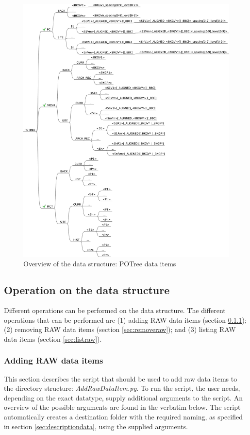 \begin{figure}[!ht]
 \centering
 \includegraphics[width=1\textwidth]{fig/directory_structure_potree}
 \caption{Overview of the data structure: POTree data items}
 \label{fig:directory_structure_overview_potree}
\end{figure}


\subsection{Operation on the data structure}
Different operations can be performed on the data structure. The different operations that can be performed are (1) adding RAW data items (section \ref{sec:addraw}); (2) removing RAW data items (section \ref{sec:removeraw}); and (3) listing RAW data items (section \ref{sec:listraw}).

\subsubsection{Adding RAW data items}
\label{sec:addraw}
This section describes the script that should be used to add raw data items to the directory structure: \textit{AddRawDataItem.py}. To run the script, the user needs, depending on the exact datatype, supply additional arguments to the script. An overview of the possible arguments are found in the verbatim below. The script automatically creates a destination folder with the required naming, as specified in section \ref{sec:descriptiondata}, using the supplied arguments.

